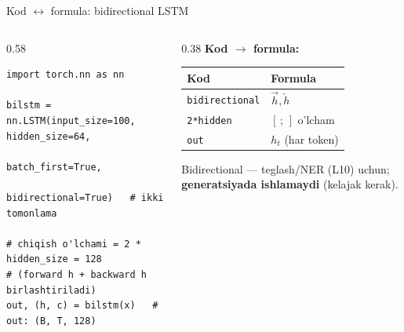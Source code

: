 \documentclass[aspectratio=169,11pt]{beamer}
\begin{document}
\begin{frame}[fragile]{Kod $\leftrightarrow$ formula: bidirectional LSTM}
  \begin{columns}[T]
    \begin{column}{0.58\textwidth}
\begin{lstlisting}
import torch.nn as nn

bilstm = nn.LSTM(input_size=100, hidden_size=64,
                 batch_first=True,
                 bidirectional=True)   # ikki tomonlama

# chiqish o'lchami = 2 * hidden_size = 128
# (forward h + backward h birlashtiriladi)
out, (h, c) = bilstm(x)   # out: (B, T, 128)
\end{lstlisting}
    \end{column}
    \begin{column}{0.38\textwidth}
      \textbf{Kod $\to$ formula:}\\[3pt]
      \footnotesize
      \begin{tabular}{p{1.9cm}p{1.9cm}}
        \toprule
        Kod & Formula \\
        \midrule
        \texttt{bidirectional} & $\overrightarrow{h},\overleftarrow{h}$ \\
        \texttt{2*hidden} & $[\,;\,]$ o'lcham \\
        \texttt{out} & $h_t$ (har token) \\
        \bottomrule
      \end{tabular}
      \vspace{4pt}
      \begin{tcolorbox}[warnbox,top=2pt,bottom=2pt]
        \footnotesize
        Bidirectional --- teglash/NER (L10) uchun; \textbf{generatsiyada ishlamaydi}
        (kelajak kerak).
      \end{tcolorbox}
    \end{column}
  \end{columns}
\end{frame}
\end{document}
